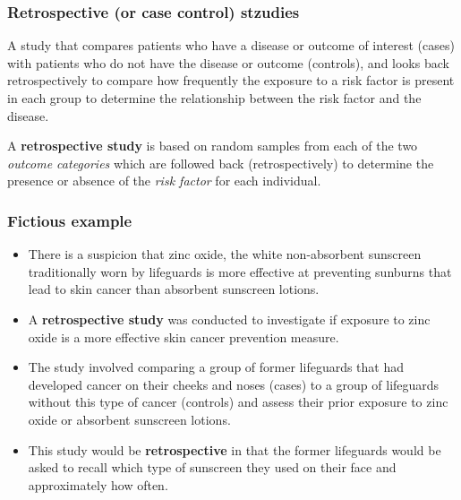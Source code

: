 \documentclass[a4paper]{article}\usepackage[]{graphicx}\usepackage[]{xcolor}
\begin{document}
\subsubsection{Retrospective (or case control) stzudies}
A study that compares patients who have a disease or outcome of interest (cases) with patients who do not have the disease or outcome (controls), and looks back retrospectively to compare how frequently the exposure to a risk factor is present in each group to determine the relationship between the risk factor and the disease.
\begin{goldbox}
	A \textbf{retrospective study} is based on random samples from each of the two \textit{outcome categories} which are followed back (retrospectively) to determine the presence or absence of the \textit{risk factor} for each individual.
\end{goldbox}
\subsubsection{Fictious example}
\begin{itemize}
	\item There is a suspicion that zinc oxide, the white non-absorbent sunscreen traditionally worn by lifeguards is more effective at preventing sunburns that lead to skin cancer than absorbent sunscreen lotions.
	\item A \textbf{retrospective study} was conducted to investigate if exposure to zinc oxide is a more effective skin cancer prevention measure.
	\item The study involved comparing a group of former lifeguards that had developed cancer on their cheeks and noses (cases) to a group of lifeguards without this type of cancer (controls) and assess their prior exposure to zinc oxide or absorbent sunscreen lotions.
	\item This study would be \textbf{retrospective} in that the former lifeguards would be asked to recall which type of sunscreen they used on their face and approximately how often.
\end{itemize}
\end{document}
